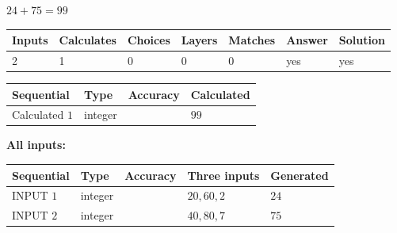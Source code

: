 \documentclass{ctexart}
\begin{document}
 
 
 
\noindent{}
 
 

$ %
24 +  %
75=   %
99$
 
 
\noindent{}
 
 

 
   
   
   
   
\noindent\begin{tabular}{|l|l|l|l|l|l|l|}
 \hline
Inputs & Calculates & Choices & Layers & Matches & Answer & Solution \\ \hline
 2  & 
 1  & 
 0
  & 
 0  & 
 0  & 
  yes & 
  yes 
  \\ \hline
 \end{tabular}
   
   
   
   
\noindent{}
   
   
  
  
\noindent\begin{tabular}{|l|l|l|l|}
\hline
 Sequential & Type & Accuracy & Calculated \\ 
\hline
 
 
  Calculated $  1 $ & integer &  & 
  $ 99 $ 
 \\  \hline  
 \end{tabular}
   
   
   
   
\noindent\vspace{0.1in}\hspace{-0.08in} {\textbf{\Large{All inputs: }}}
   
   
  
  
\noindent\begin{tabular}{|l|l|l|l|l|}
\hline
 Sequential & Type & Accuracy & Three inputs & Generated \\ 
\hline
 
 
  INPUT $  1 $ & integer &  & $
 20
 , 
 60
 , 
 2
 $ & $ 24 $ 
 \\  \hline  
 
 
  INPUT $  2 $ & integer &  & $
 40
 , 
 80
 , 
 7
 $ & $ 75 $ 
 \\  \hline  
 \end{tabular}
   
\end{document}
